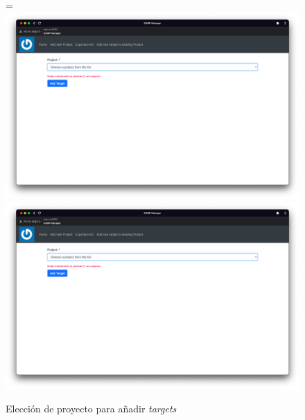 \begin{figure}[H]
    =\hbox{\includegraphics[width=\textwidth]{include/desarrollo/app_images/add_target_choose_project.png}}
    \includegraphics[width=\textwidth]{include/desarrollo/app_images/add_target_choose_project.png}
    \caption{Elección de proyecto para añadir	\textit{targets}}
    \label{fig:gui_add_target_choose_project}
\end{figure}

